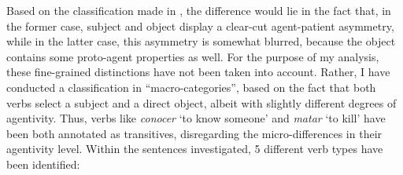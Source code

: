Based on the classification made in \textcite{dowty1991thematic}, the difference would lie in the fact that, in the former case, subject and object display a clear-cut agent-patient asymmetry, while in the latter case, this asymmetry is somewhat blurred, because the object contains some proto-agent properties as well.
For the purpose of my analysis, these fine-grained distinctions have not been taken into account. Rather, I have conducted a classification in ``macro-categories”, based on the fact that both verbs select a subject and a direct object, albeit with slightly different degrees of agentivity. Thus, verbs like \textit{conocer} `to know someone' and \textit{matar} `to kill' have been both annotated as transitives, disregarding the micro-differences in their agentivity level. Within the sentences investigated, 5 different verb types have been identified:
